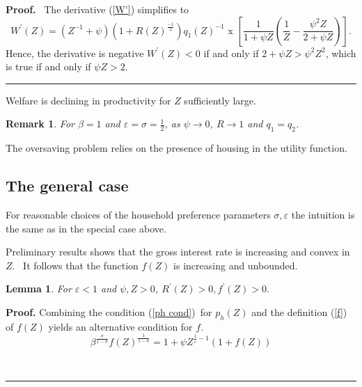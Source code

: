 \documentclass{article}
\newtheorem{lemma}[theorem]{Lemma}
\newtheorem{remark}[theorem]{Remark}
\newenvironment{proof}[1][Proof]{\noindent\textbf{#1.} }{\ \rule{0.5em}{0.5em}}
\begin{document}
\begin{doublespace}
\begin{proof}
\ The derivative (\ref{W'}) simplifies to%
\begin{equation*}
W^{\prime }\left( Z\right) =\left( Z^{-1}+\psi \right) \left( 1+R\left(
Z\right) ^{\frac{-1}{2}}\right) q_{1}\left( Z\right) ^{-1}\text{ x }\left[ 
\frac{1}{1+\psi Z}\left( \frac{1}{Z}-\frac{\psi ^{2}Z}{2+\psi Z}\right) %
\right] .
\end{equation*}%
Hence, the derivative is negative $W^{\prime }\left( Z\right) <0$ if and
only if $2+\psi Z>\psi ^{2}Z^{2}$, which is true if and only if $\psi Z>2$.
\end{proof}

Welfare is declining in productivity for $Z$ sufficiently large. \ 

\begin{remark}
For $\beta =1$ and $\varepsilon =\sigma =\frac{1}{2}$, as $\psi \rightarrow
0 $, $R\rightarrow 1$ and $q_{1}=q_{2}$.
\end{remark}

The oversaving problem relies on the presence of housing in the utility
function. \ 

\subsection{The general case}

For reasonable choices of the household preference parameters $\sigma
,\varepsilon $ the intuition is the same as in the special case above. \ 

Preliminary results shows that the gross interest rate is increasing and
convex in $Z$. \ It follows that the function $f\left( Z\right) $ is
increasing and unbounded.

\begin{lemma}
For $\varepsilon <1$ and $\psi ,Z>0$, $R^{\prime }\left( Z\right)
>0,f^{\prime }\left( Z\right) >0.$
\end{lemma}

\begin{proof}
Combining the condition (\ref{ph cond})\ for $p_{h}\left( Z\right) $ and the
definition (\ref{f}) of $f\left( Z\right) $ yields an alternative condition
for $f$.%
\begin{equation}
\beta ^{\frac{\sigma }{1-\sigma }}f\left( Z\right) ^{\frac{1}{1-\sigma }%
}=1+\psi Z^{\frac{1}{\varepsilon }-1}\left( 1+f\left( Z\right) \right)
\label{f cond}
\end{equation}


\end{proof}
\end{doublespace}
\end{document}
